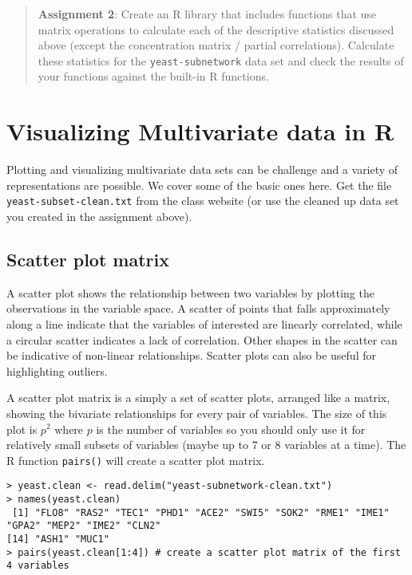 \begin{quote}
\textbf{Assignment 2}: Create an R library that includes functions that
use matrix operations to calculate each of the descriptive statistics
discussed above (except the concentration matrix / partial
correlations). Calculate these statistics for the
\lstinline!yeast-subnetwork! data set and check the results of your
functions against the built-in R functions.

\end{quote}
\section{Visualizing Multivariate data in R}

Plotting and visualizing multivariate data sets can be challenge and a
variety of representations are possible. We cover some of the basic ones
here. Get the file \lstinline!yeast-subset-clean.txt! from the class
website (or use the cleaned up data set you created in the assignment
above).

\subsection{Scatter plot matrix}

A scatter plot shows the relationship between two variables by plotting
the observations in the variable space. A scatter of points that falls
approximately along a line indicate that the variables of interested are
linearly correlated, while a circular scatter indicates a lack of
correlation. Other shapes in the scatter can be indicative of non-linear
relationships. Scatter plots can also be useful for highlighting
outliers.

A scatter plot matrix is a simply a set of scatter plots, arranged like
a matrix, showing the bivariate relationships for every pair of
variables. The size of this plot is $p^2$ where $p$ is the number of
variables so you should only use it for relatively small subsets of
variables (maybe up to 7 or 8 variables at a time). The R function
\lstinline!pairs()! will create a scatter plot matrix.

\begin{lstlisting}
> yeast.clean <- read.delim("yeast-subnetwork-clean.txt")
> names(yeast.clean)
 [1] "FLO8" "RAS2" "TEC1" "PHD1" "ACE2" "SWI5" "SOK2" "RME1" "IME1" "GPA2" "MEP2" "IME2" "CLN2"
[14] "ASH1" "MUC1"
> pairs(yeast.clean[1:4]) # create a scatter plot matrix of the first 4 variables
\end{lstlisting}
